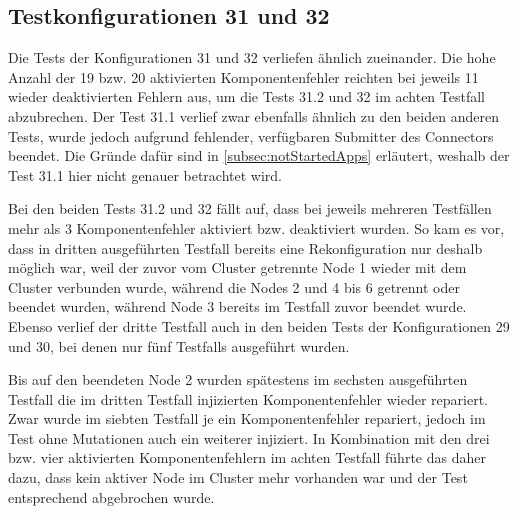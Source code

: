 \subsection{Testkonfigurationen 31 und 32}
\label{subsec:noReconf3132}

Die \glspl{Test} der Konfigurationen 31 und 32 verliefen ähnlich zueinander.
Die hohe Anzahl der 19 bzw. 20 aktivierten Komponentenfehler reichten bei jeweils 11 wieder deaktivierten Fehlern aus, um die \glspl{Test} 31.2 und 32 im achten \gls{Testfall} abzubrechen.
Der \gls{Test} 31.1 verlief zwar ebenfalls ähnlich zu den beiden anderen Tests, wurde jedoch aufgrund fehlender, verfügbaren Submitter des Connectors beendet.
Die Gründe dafür sind in \cref{subsec:notStartedApps} erläutert, weshalb der \gls{Test} 31.1 hier nicht genauer betrachtet wird.

Bei den beiden \glspl{Test} 31.2 und 32 fällt auf, dass bei jeweils mehreren Testfällen mehr als 3 Komponentenfehler aktiviert bzw. deaktiviert wurden.
So kam es vor, dass \zB in dritten ausgeführten \gls{Testfall} bereits eine Rekonfiguration nur deshalb möglich war, weil der zuvor vom Cluster getrennte Node 1 wieder mit dem Cluster verbunden wurde, während die Nodes 2 und 4 bis 6 getrennt oder beendet wurden, während Node 3 bereits im \gls{Testfall} zuvor beendet wurde.
Ebenso verlief der dritte \gls{Testfall} auch in den beiden \glspl{Test} der Konfigurationen 29 und 30, bei denen nur fünf \glspl{Testfall} ausgeführt wurden.

Bis auf den beendeten Node 2 wurden spätestens im sechsten ausgeführten \gls{Testfall} die im dritten \gls{Testfall} injizierten Komponentenfehler wieder repariert.
Zwar wurde im siebten \gls{Testfall} je ein Komponentenfehler repariert, jedoch im \gls{Test} ohne Mutationen auch ein weiterer injiziert.
In Kombination mit den drei bzw. vier aktivierten Komponentenfehlern im achten \gls{Testfall} führte das daher dazu, dass kein aktiver Node im Cluster mehr vorhanden war und der \gls{Test} entsprechend abgebrochen wurde.
